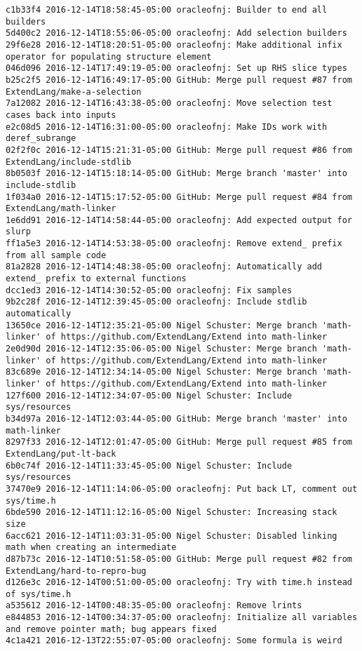 \begin{lstlisting}
c1b33f4 2016-12-14T18:58:45-05:00 oracleofnj: Builder to end all builders
5d400c2 2016-12-14T18:55:06-05:00 oracleofnj: Add selection builders
29f6e28 2016-12-14T18:20:51-05:00 oracleofnj: Make additional infix operator for populating structure element
046d096 2016-12-14T17:49:19-05:00 oracleofnj: Set up RHS slice types
b25c2f5 2016-12-14T16:49:17-05:00 GitHub: Merge pull request #87 from ExtendLang/make-a-selection
7a12082 2016-12-14T16:43:38-05:00 oracleofnj: Move selection test cases back into inputs
e2c08d5 2016-12-14T16:31:00-05:00 oracleofnj: Make IDs work with deref_subrange
02f2f0c 2016-12-14T15:21:31-05:00 GitHub: Merge pull request #86 from ExtendLang/include-stdlib
8b0503f 2016-12-14T15:18:14-05:00 GitHub: Merge branch 'master' into include-stdlib
1f034a0 2016-12-14T15:17:52-05:00 GitHub: Merge pull request #84 from ExtendLang/math-linker
1e6dd91 2016-12-14T14:58:44-05:00 oracleofnj: Add expected output for slurp
ff1a5e3 2016-12-14T14:53:38-05:00 oracleofnj: Remove extend_ prefix from all sample code
81a2828 2016-12-14T14:48:38-05:00 oracleofnj: Automatically add extend_ prefix to external functions
dcc1ed3 2016-12-14T14:30:52-05:00 oracleofnj: Fix samples
9b2c28f 2016-12-14T12:39:45-05:00 oracleofnj: Include stdlib automatically
13650ce 2016-12-14T12:35:21-05:00 Nigel Schuster: Merge branch 'math-linker' of https://github.com/ExtendLang/Extend into math-linker
2e0d90d 2016-12-14T12:35:06-05:00 Nigel Schuster: Merge branch 'math-linker' of https://github.com/ExtendLang/Extend into math-linker
83c689e 2016-12-14T12:34:14-05:00 Nigel Schuster: Merge branch 'math-linker' of https://github.com/ExtendLang/Extend into math-linker
127f600 2016-12-14T12:34:07-05:00 Nigel Schuster: Include sys/resources
b34d97a 2016-12-14T12:03:44-05:00 GitHub: Merge branch 'master' into math-linker
8297f33 2016-12-14T12:01:47-05:00 GitHub: Merge pull request #85 from ExtendLang/put-lt-back
6b0c74f 2016-12-14T11:33:45-05:00 Nigel Schuster: Include sys/resources
37470e9 2016-12-14T11:14:06-05:00 oracleofnj: Put back LT, comment out sys/time.h
6bde590 2016-12-14T11:12:16-05:00 Nigel Schuster: Increasing stack size
6acc621 2016-12-14T11:03:31-05:00 Nigel Schuster: Disabled linking math when creating an intermediate
d87b73c 2016-12-14T10:51:58-05:00 GitHub: Merge pull request #82 from ExtendLang/hard-to-repro-bug
d126e3c 2016-12-14T00:51:00-05:00 oracleofnj: Try with time.h instead of sys/time.h
a535612 2016-12-14T00:48:35-05:00 oracleofnj: Remove lrints
e844853 2016-12-14T00:34:37-05:00 oracleofnj: Initialize all variables and remove pointer math; bug appears fixed
4c1a421 2016-12-13T22:55:07-05:00 oracleofnj: Some formula is weird

\end{lstlisting}
